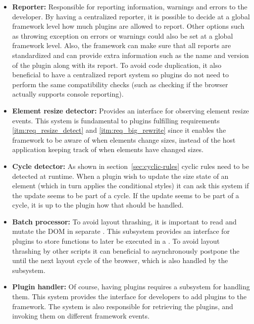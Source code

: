 \documentclass[a4paper,11pt]{kth-mag}
\begin{document}
        \begin{itemize}
          \item \textbf{Reporter:}
            Responsible for reporting information, warnings and errors to the developer.
            By having a centralized reporter, it is possible to decide at a global framework level how much plugins are allowed to report.
            Other options such as throwing exception on errors or warnings could also be set at a global framework level.
            Also, the framework can make sure that all reports are standardized and can provide extra information such as the name and version of the plugin along with its report.
            To avoid code duplication, it also beneficial to have a centralized report system so plugins do not need to perform the same compatibility checks (such as checking if the \gls{browser} actually supports console reporting).
          \item \textbf{Element resize detector:}
            Provides an interface for observing \gls{element} resize events.
            This system is fundamental to plugins fulfilling requirements \ref{itm:req_resize_detect} and \ref{itm:req_big_rewrite} since it enables the framework to be aware of when \glspl{element} change sizes, instead of the host application keeping track of when \glspl{element} have changed sizes.
          \item \textbf{Cycle detector:}
            As shown in section~\ref{sec:cyclic-rules} cyclic rules need to be detected at runtime.
            When a plugin wish to update the size state of an \gls{element} (which in turn applies the conditional styles) it can ask this system if the update seems to be part of a cycle.
            If the update seems to be part of a cycle, it is up to the plugin how that should be handled.
          \item \textbf{Batch processor:}
            To avoid \gls{layout thrashing}, it is important to read and mutate the \gls{DOM} in separate .
            This subsystem provides an interface for plugins to store functions to later be executed in a .
            To avoid \gls{layout thrashing} by other scripts it can beneficial to asynchronously postpone the  until the next layout cycle of the \gls{browser}, which is also handled by the subsystem.
          \item \textbf{Plugin handler:}
            Of course, having plugins requires a subsystem for handling them.
            This system provides the interface for developers to add plugins to the framework.
            The system is also responsible for retrieving the plugins, and invoking them on different framework events.
        \end{itemize}
\end{document}
